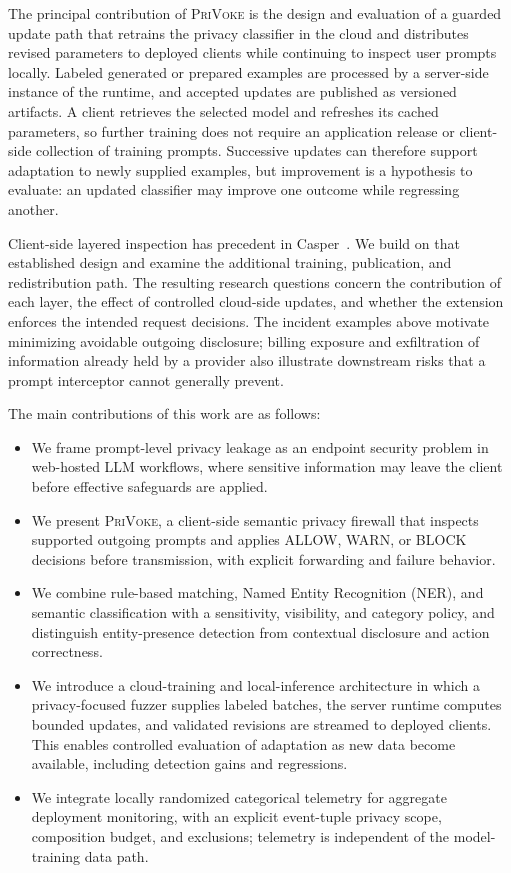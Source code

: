 \documentclass[conference]{IEEEtran}
\newcommand{\privoke}{\textsc{PriVoke}\xspace}
\begin{document}
The principal contribution of \privoke is the design and evaluation of a guarded update path that retrains the privacy classifier in the cloud and distributes revised parameters to deployed clients while continuing to inspect user prompts locally. Labeled generated or prepared examples are processed by a server-side instance of the runtime, and accepted updates are published as versioned artifacts. A client retrieves the selected model and refreshes its cached parameters, so further training does not require an application release or client-side collection of training prompts. Successive updates can therefore support adaptation to newly supplied examples, but improvement is a hypothesis to evaluate: an updated classifier may improve one outcome while regressing another.

Client-side layered inspection has precedent in Casper~\cite{Casper2024}. We build on that established design and examine the additional training, publication, and redistribution path. The resulting research questions concern the contribution of each layer, the effect of controlled cloud-side updates, and whether the extension enforces the intended request decisions. The incident examples above motivate minimizing avoidable outgoing disclosure; billing exposure and exfiltration of information already held by a provider also illustrate downstream risks that a prompt interceptor cannot generally prevent.

The main contributions of this work are as follows:
\begin{itemize}
    \item We frame prompt-level privacy leakage as an endpoint security problem in web-hosted LLM workflows, where sensitive information may leave the client before effective safeguards are applied.

    \item We present \privoke, a client-side semantic privacy firewall that inspects supported outgoing prompts and applies ALLOW, WARN, or BLOCK decisions before transmission, with explicit forwarding and failure behavior.

    \item We combine rule-based matching, Named Entity Recognition (NER), and semantic classification with a sensitivity, visibility, and category policy, and distinguish entity-presence detection from contextual disclosure and action correctness.

    \item We introduce a cloud-training and local-inference architecture in which a privacy-focused fuzzer supplies labeled batches, the server runtime computes bounded updates, and validated revisions are streamed to deployed clients. This enables controlled evaluation of adaptation as new data become available, including detection gains and regressions.

    \item We integrate locally randomized categorical telemetry for aggregate deployment monitoring, with an explicit event-tuple privacy scope, composition budget, and exclusions; telemetry is independent of the model-training data path.
\end{itemize}
\end{document}
